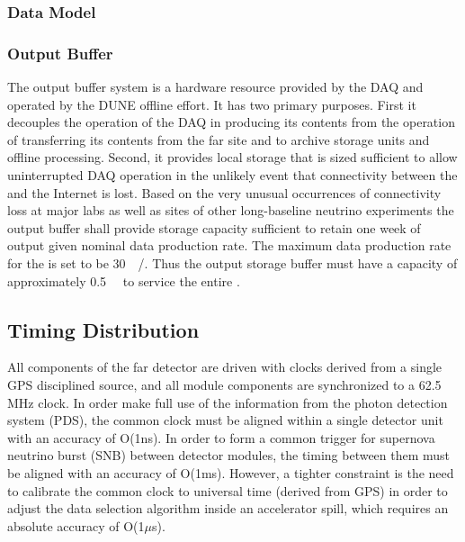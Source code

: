 \subsubsection{Data Model}
\label{sec:fd-daq:design-data-model}


\subsubsection{Output Buffer}


The output buffer system is a hardware resource provided by the DAQ and operated by the DUNE offline effort. 
It has two primary purposes. 
First it decouples the operation of the DAQ in producing its contents from the operation of transferring its contents from the far site and to archive storage units and offline processing. 
Second, it provides local storage that is sized sufficient to allow uninterrupted DAQ operation in the unlikely event that connectivity between the  and the Internet is lost. 
Based on the very unusual occurrences of connectivity loss at major labs as well as  sites of other long-baseline neutrino experiments the output buffer shall provide storage capacity sufficient to retain one week of output given nominal data production rate. 
The maximum data production rate for the  is set to be \SI{30}{\peta\byte/\year}. 
Thus the output storage buffer must have a capacity of approximately \SI{0.5}{\peta\byte} to service the entire .




\subsection{Timing Distribution}
\label{sec:sp-daq:design-timing}

All components of the far detector are driven with clocks derived
from a single GPS disciplined source, and all module components
are synchronized to a 62.5 MHz clock. In order make full use of the
information from the photon detection system (PDS), the common clock
must be aligned within a single detector unit with an accuracy of
O(1ns). In order to form a common trigger for supernova neutrino burst
(SNB) between detector modules, the timing between them must be
aligned with an accuracy of O(1ms). However, a tighter constraint is
the need to calibrate the common clock to universal time (derived from
GPS) in order to adjust the data selection algorithm inside an
accelerator spill, which requires an absolute accuracy of O(1$\mu$s).

